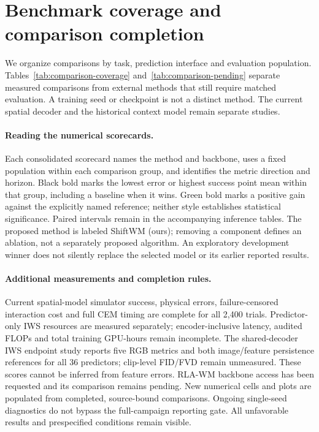 \section{Benchmark coverage and comparison completion}
\label{app:comparison-inventory}
We organize comparisons by task, prediction interface and evaluation population.
Tables~\ref{tab:comparison-coverage} and~\ref{tab:comparison-pending}
separate measured comparisons from external methods that still require matched
evaluation. A training seed or checkpoint is not a distinct method. The current
spatial decoder and the historical context model remain separate studies.



\paragraph{Reading the numerical scorecards.}
Each consolidated scorecard names the method and backbone, uses a fixed population within
each comparison group, and identifies the metric direction and horizon.
Black bold marks the lowest error or highest success point mean within that
group, including a baseline when it wins. Green bold marks a positive gain
against the explicitly named reference; neither style establishes statistical
significance. Paired intervals remain in the accompanying inference tables.
The proposed method is labeled ShiftWM (ours); removing a component defines an
ablation, not a separately proposed algorithm. An exploratory development winner
does not silently replace the selected model or its earlier reported results.



\paragraph{Additional measurements and completion rules.}
Current spatial-model simulator success, physical errors, failure-censored
interaction cost and full CEM timing are complete for all 2,400 trials.
Predictor-only IWS resources are measured separately; encoder-inclusive latency,
audited FLOPs and total training GPU-hours remain incomplete.
The shared-decoder IWS endpoint study reports five RGB metrics and both
image/feature persistence references for all 36 predictors; clip-level FID/FVD
remain unmeasured. These scores cannot be inferred from feature errors.
RLA-WM backbone access has been requested and its comparison remains pending.
New numerical cells and plots are
populated from completed, source-bound comparisons. Ongoing single-seed diagnostics
do not bypass the full-campaign reporting gate. All unfavorable results and
prespecified conditions remain visible.

